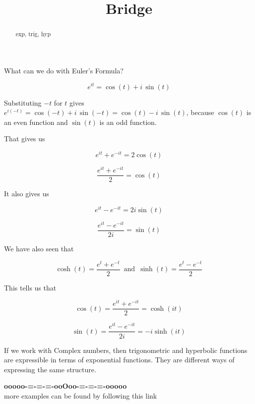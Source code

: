 \documentclass{ximera}
\title{Bridge}
\begin{document}
\begin{abstract}
exp, trig, hyp
\end{abstract}
\maketitle





What can we do with Euler's Formula?



\[ e^{i t} = \cos(t) + i \, \sin(t) \]

Substituting $-t$ for $t$ gives $e^{i (-t)} = \cos(-t) + i \, \sin(-t) = \cos(t) - i \, \sin(t)$, because $\cos(t)$ is an even function and $\sin(t)$ is an odd function.



That gives us 

\[   e^{i t}  + e^{-i t} = 2 \cos(t)    \]


\[   \frac{e^{i t}  + e^{-i t}}{2} = \cos(t)    \]


It also gives us 



\[   e^{i t}  - e^{-i t} = 2 i \sin(t)    \]


\[   \frac{e^{i t}  - e^{-i t}}{2 i} = \sin(t)    \]





We have also seen that 


\[  \cosh(t)  = \frac{e^t + e^{-t}}{2}      \,   \text{ and } \,  \sinh(t)  = \frac{e^t - e^{-t}}{2}     \]



This tells us that 

\[  \cos(t) =  \frac{e^{i t} + e^{-i t}}{2} = \cosh(i t)      \]




\[  \sin(t) =  \frac{e^{i t} - e^{-i t}}{2 i} = -i \sinh(i t)      \]






If we work with Complex numbers, then trigonometric and hyperbolic functions are expressible in terms of exponential functions.  They are different ways of expressing the same structure.






















\begin{center}
\textbf{\textcolor{green!50!black}{ooooo-=-=-=-ooOoo-=-=-=-ooooo}} \\

more examples can be found by following this link\\ 

\end{center}
\end{document}
